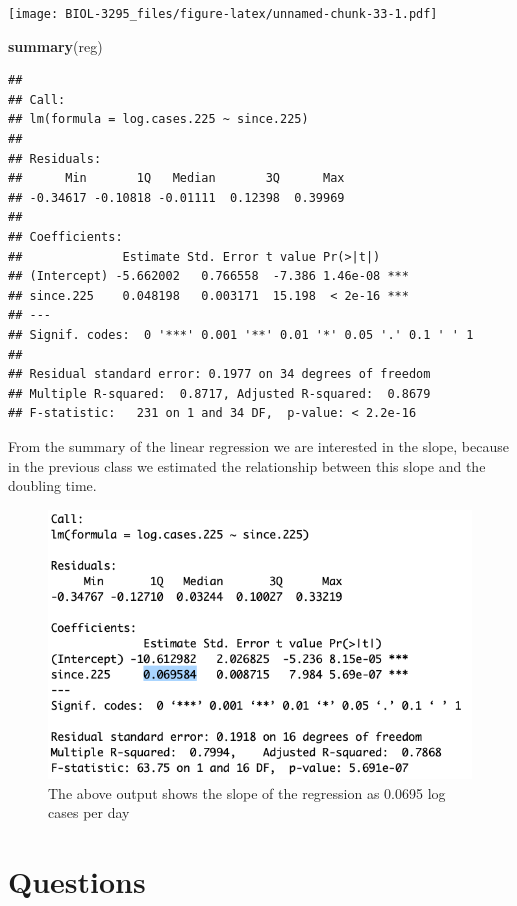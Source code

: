 \documentclass[]{book}
\newenvironment{Shaded}{\begin{snugshade}}{\end{snugshade}}
\newcommand{\KeywordTok}[1]{\textcolor[rgb]{0.13,0.29,0.53}{\textbf{{#1}}}}
\newcommand{\NormalTok}[1]{{#1}}
\begin{document}
\texttt{[image: BIOL-3295\_files/figure-latex/unnamed-chunk-33-1.pdf]}

\begin{Shaded}
\begin{Highlighting}[]
\KeywordTok{summary}\NormalTok{(reg)}
\end{Highlighting}
\end{Shaded}

\begin{verbatim}
## 
## Call:
## lm(formula = log.cases.225 ~ since.225)
## 
## Residuals:
##      Min       1Q   Median       3Q      Max 
## -0.34617 -0.10818 -0.01111  0.12398  0.39969 
## 
## Coefficients:
##              Estimate Std. Error t value Pr(>|t|)    
## (Intercept) -5.662002   0.766558  -7.386 1.46e-08 ***
## since.225    0.048198   0.003171  15.198  < 2e-16 ***
## ---
## Signif. codes:  0 '***' 0.001 '**' 0.01 '*' 0.05 '.' 0.1 ' ' 1
## 
## Residual standard error: 0.1977 on 34 degrees of freedom
## Multiple R-squared:  0.8717, Adjusted R-squared:  0.8679 
## F-statistic:   231 on 1 and 34 DF,  p-value: < 2.2e-16
\end{verbatim}

From the summary of the linear regression we are interested in the
slope, because in the previous class we estimated the relationship
between this slope and the doubling time.

\begin{figure}
\includegraphics[width=0.95\linewidth]{figures/regression} \caption{The above output shows the slope of the regression as 0.0695 log cases per day}\label{fig:regression}
\end{figure}

\section{Questions}\label{questions-7}
\end{document}
